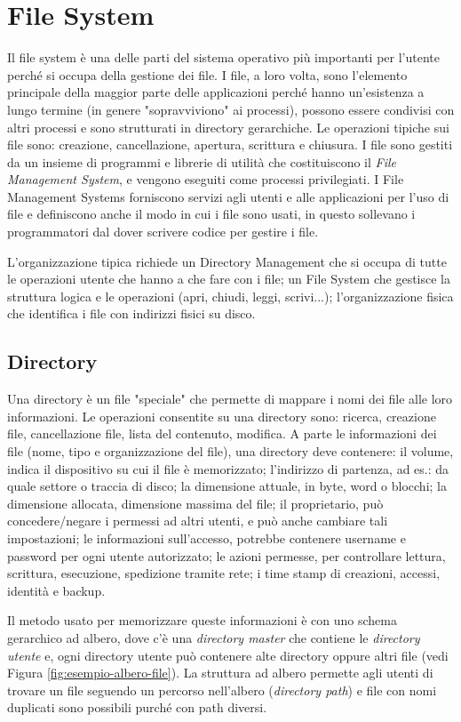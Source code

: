 \chapter{File System}
Il file system è una delle parti del sistema operativo più importanti per l'utente perché si occupa della gestione dei file. I file, a loro volta, sono l'elemento principale della maggior parte delle applicazioni perché hanno un'esistenza a lungo termine (in genere "sopravviviono" ai processi), possono essere condivisi con altri processi e sono strutturati in directory gerarchiche. Le operazioni tipiche sui file sono: creazione, cancellazione, apertura, scrittura e chiusura. I file sono gestiti da un insieme di programmi e librerie di utilità che costituiscono il \textit{File Management System}, e vengono eseguiti come processi privilegiati. I File Management Systems forniscono servizi agli utenti e alle applicazioni per l'uso di file e definiscono anche il modo in cui i file sono usati, in questo sollevano i programmatori dal dover scrivere codice per gestire i file.

L'organizzazione tipica richiede un Directory Management che si occupa di tutte le operazioni utente che hanno a che fare con i file; un File System che gestisce la struttura logica e le operazioni (apri, chiudi, leggi, scrivi...); l'organizzazione fisica che identifica i file con indirizzi fisici su disco.

\section{Directory}
Una directory è un file "speciale" che permette di mappare i nomi dei file alle loro informazioni. Le operazioni consentite su una directory sono: ricerca, creazione file, cancellazione file, lista del contenuto, modifica. A parte le informazioni dei file (nome, tipo e organizzazione del file), una directory deve contenere: il volume, indica il dispositivo su cui il file è memorizzato; l'indirizzo di partenza, ad es.: da quale settore o traccia di disco; la dimensione attuale, in byte, word o blocchi; la dimensione allocata, dimensione massima del file; il proprietario, può concedere/negare i permessi ad altri utenti, e può anche cambiare tali impostazioni; le informazioni sull'accesso, potrebbe contenere username e password per ogni utente autorizzato; le azioni permesse, per controllare lettura, scrittura, esecuzione, spedizione tramite rete; i time stamp di creazioni, accessi, identità e backup. 

Il metodo usato per memorizzare queste informazioni è con uno schema gerarchico ad albero, dove c'è una \textit{directory master} che contiene le \textit{directory utente} e, ogni directory utente può contenere alte directory oppure altri file (vedi Figura \ref{fig:esempio-albero-file}). La struttura ad albero permette agli utenti di trovare un file seguendo un percorso nell'albero (\textit{directory path}) e file con nomi duplicati sono possibili purché con path diversi.

